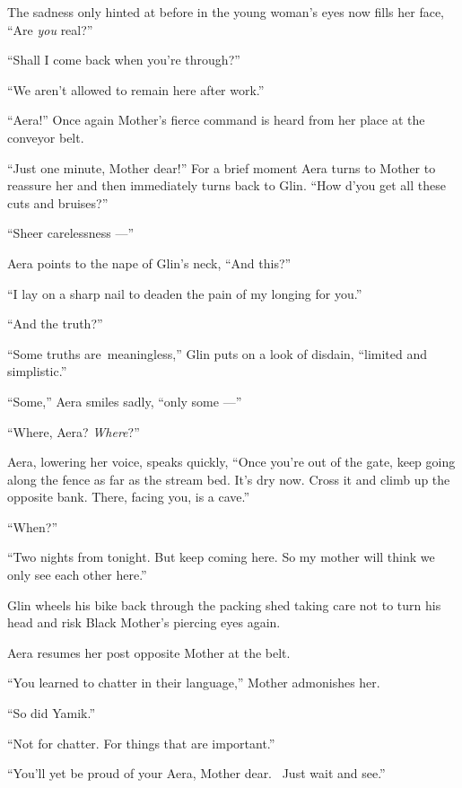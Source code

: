 \documentclass[twoside,11pt]{book}
\begin{document}
The sadness only hinted at before in the young woman's eyes now fills her face, ``Are \textit{you}
real?''

``Shall I come back when you're through?''

``We aren't allowed to remain here after work.''

``Aera!'' Once again Mother's fierce command is heard from her place at the conveyor belt.

``Just one minute, Mother dear!'' For a brief moment\MakeUppercase{ a}era turns to Mother to
reassure her and then immediately turns back to Glin. ``How d'you get all these cuts and
bruises?''

``Sheer carelessness ---''

Aera points to the nape of Glin's neck, ``And this?''

``I lay on a sharp nail to deaden the pain of my longing for you.''

``And the truth?''

``Some truths are~meaningless,'' Glin puts on a look of disdain, ``limited and
simplistic.''

``Some,'' Aera smiles sadly, ``only some ---''

``Where, Aera? \textit{Where}?''

Aera, lowering her voice, speaks quickly, ``Once you're out of the gate, keep going along the fence as far
as the stream bed. It's dry now. Cross it and climb up the opposite bank. There, facing you, is a
cave.''

``When?''

``Two nights from tonight. But keep coming here. So my mother will think we only see each other
here.''

Glin wheels his bike back through the packing shed taking care not to turn his head and risk Black Mother's piercing
eyes again.

Aera resumes her post opposite Mother at the belt.

``You learned to chatter in their language,'' Mother admonishes her.

``So did Yamik.''

``Not for chatter. For things that are important.''

``You'll yet be proud of your Aera, Mother dear.~ Just wait and see.''



\chapter{}
\end{document}
